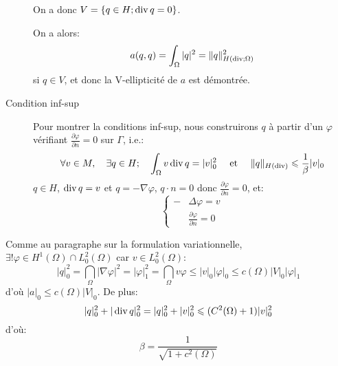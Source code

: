 \begin{description}
On a donc $V=\left\{ q\in H; \operatorname{div} q=0\right\}$.

On a alors:
\begin{equation}a(q,q)=\displaystyle\int_\Omega |q|^2 = \|q\|^2_{H(\operatorname{div};\Omega)}\end{equation} si $q\in V$, et
donc la V-ellipticité de $a$ est démontrée.

\medskip
\item[Condition inf-sup]
Pour montrer la conditions inf-sup, nous construirons $q$ à partir d'un $\varphi$ vérifiant
$\frac{\partial\varphi}{\partial n}=0$ sur $\Gamma$, i.e.:
\begin{equation}
\forall v\in M,\quad \exists q\in H;\quad \displaystyle\int_\Omega v \operatorname{div} q = |v|_0^2 \quad\text{ et }\quad
\|q\|_{H(\operatorname{div})}\leqslant \frac1\beta |v|_0
\end{equation}
$q\in H$, $\operatorname{div} q=v$ et $q=-\nabla\varphi$, $q\cdot n=0$ donc $\frac{\partial\varphi}{\partial n}=0$,
et:
\begin{equation}\left\{
\begin{aligned}
-&\Delta \varphi = v\\
&\frac{\partial \varphi}{\partial n}=0
\end{aligned}
\right.
\end{equation}
\end{description}
Comme au paragraphe sur la formulation variationnelle, $\exists!\varphi\in H^1(\Omega)\cap L^2_0(\Omega)$
car  $v\in L^2_0(\Omega)$:
\begin{equation}
|q|_0^2=\dint_\Omega |\nabla \varphi|^2 = |\varphi|_1^2 = \dint_\Omega v\varphi \le |v|_0 |\varphi|_0
\le c(\Omega) |V|_0 |\varphi|_1\end{equation} d'où $|a|_0\le c(\Omega) |V|_0$. De plus:
\begin{equation}|q|_0^2+|\operatorname{div} q|_0^2 = |q|_0^2+|v|_0^2 \leqslant (C^2(\Omega)+1)|v|_0^2\end{equation}
d'où:
\begin{equation}\beta = \frac1{\sqrt{1+c^2(\Omega)}}\end{equation}

\medskip
{}




